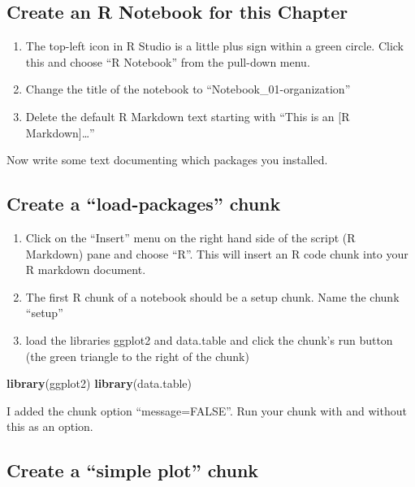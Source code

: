 \documentclass[]{book}
\newenvironment{Shaded}{\begin{snugshade}}{\end{snugshade}}
\newcommand{\KeywordTok}[1]{\textcolor[rgb]{0.13,0.29,0.53}{\textbf{#1}}}
\newcommand{\NormalTok}[1]{#1}
\providecommand{\tightlist}{%
  \setlength{\itemsep}{0pt}\setlength{\parskip}{0pt}}
\begin{document}
\subsection{Create an R Notebook for this
Chapter}\label{create-an-r-notebook-for-this-chapter}

\begin{enumerate}
\def\labelenumi{\arabic{enumi}.}
\tightlist
\item
  The top-left icon in R Studio is a little plus sign within a green
  circle. Click this and choose ``R Notebook'' from the pull-down menu.
\item
  Change the title of the notebook to ``Notebook\_01-organization''
\item
  Delete the default R Markdown text starting with ``This is an {[}R
  Markdown{]}\ldots{}''
\end{enumerate}

Now write some text documenting which packages you installed.

\subsection{\texorpdfstring{Create a ``load-packages''
chunk}{Create a load-packages chunk}}\label{create-a-load-packages-chunk}

\begin{enumerate}
\def\labelenumi{\arabic{enumi}.}
\tightlist
\item
  Click on the ``Insert'' menu on the right hand side of the script (R
  Markdown) pane and choose ``R''. This will insert an R code chunk into
  your R markdown document.
\item
  The first R chunk of a notebook should be a setup chunk. Name the
  chunk ``setup''
\item
  load the libraries ggplot2 and data.table and click the chunk's run
  button (the green triangle to the right of the chunk)
\end{enumerate}

\begin{Shaded}
\begin{Highlighting}[]
\KeywordTok{library}\NormalTok{(ggplot2)}
\KeywordTok{library}\NormalTok{(data.table)}
\end{Highlighting}
\end{Shaded}

I added the chunk option ``message=FALSE''. Run your chunk with and
without this as an option.

\subsection{\texorpdfstring{Create a ``simple plot''
chunk}{Create a simple plot chunk}}\label{create-a-simple-plot-chunk}
\end{document}
